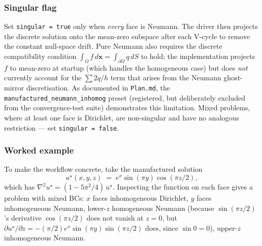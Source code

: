 \documentclass[11pt]{article}
\theoremstyle{definition}
\begin{document}
\subsubsection{Singular flag}\label{sec:preset-singular}

Set \verb|singular = true| only when \emph{every} face is Neumann.
The driver then projects the discrete solution onto the mean-zero
subspace after each V-cycle to remove the constant null-space drift.
Pure Neumann also requires the discrete compatibility condition
$\int_\Omega f \, d\mathbf{x} = \int_{\partial\Omega} q \, dS$ to hold;
the implementation projects $f$ to mean-zero at startup (which handles
the homogeneous case) but does \emph{not} currently account for the
$\sum 2 q / h$ term that arises from the Neumann ghost-mirror
discretisation.  As documented in \texttt{Plan.md}, the
\texttt{manufactured\_neumann\_inhomog} preset (registered, but
deliberately excluded from the convergence-test suite) demonstrates
this limitation.  Mixed problems, where at least one face is
Dirichlet, are non-singular and have no analogous restriction --- set
\verb|singular = false|.

\subsubsection{Worked example}\label{sec:adding-preset-example}

To make the workflow concrete, take the manufactured solution
\begin{equation*}
  u^{\star}(x,y,z) \;=\; e^{x} \sin(\pi y) \cos(\pi z / 2),
\end{equation*}
which has $\nabla^{2} u^{\star} = (1 - 5\pi^{2}/4) \, u^{\star}$.
Inspecting the function on each face gives a problem with mixed BCs:
$x$ faces inhomogeneous Dirichlet, $y$ faces inhomogeneous Neumann,
lower-$z$ homogeneous Neumann (because $\sin(\pi z/2)$'s derivative
$\cos(\pi z/2)$ does not vanish at $z=0$, but
$\partial u^\star/\partial z = -(\pi/2) e^x \sin(\pi y) \sin(\pi z/2)$
does, since $\sin 0 = 0$), upper-$z$ inhomogeneous Neumann.
\end{document}
